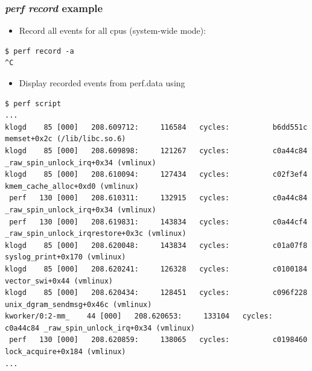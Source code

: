 \begin{frame}[fragile]
  \frametitle{{\em perf record} example}

  \begin{itemize}
    \item Record all events for all cpus (system-wide mode):
  \end{itemize}
  \begin{block}{}
    \begin{verbatim}
$ perf record -a
^C
    \end{verbatim}
  \end{block}
  \begin{itemize}
    \item Display recorded events from perf.data using 
  \end{itemize}
  \begin{block}{}
    \begin{verbatim}
$ perf script
...
klogd    85 [000]   208.609712:     116584   cycles:          b6dd551c memset+0x2c (/lib/libc.so.6)
klogd    85 [000]   208.609898:     121267   cycles:          c0a44c84 _raw_spin_unlock_irq+0x34 (vmlinux)
klogd    85 [000]   208.610094:     127434   cycles:          c02f3ef4 kmem_cache_alloc+0xd0 (vmlinux)
 perf   130 [000]   208.610311:     132915   cycles:          c0a44c84 _raw_spin_unlock_irq+0x34 (vmlinux)
 perf   130 [000]   208.619831:     143834   cycles:          c0a44cf4 _raw_spin_unlock_irqrestore+0x3c (vmlinux)
klogd    85 [000]   208.620048:     143834   cycles:          c01a07f8 syslog_print+0x170 (vmlinux)
klogd    85 [000]   208.620241:     126328   cycles:          c0100184 vector_swi+0x44 (vmlinux)
klogd    85 [000]   208.620434:     128451   cycles:          c096f228 unix_dgram_sendmsg+0x46c (vmlinux)
kworker/0:2-mm_    44 [000]   208.620653:     133104   cycles:          c0a44c84 _raw_spin_unlock_irq+0x34 (vmlinux)
 perf   130 [000]   208.620859:     138065   cycles:          c0198460 lock_acquire+0x184 (vmlinux)
...
    \end{verbatim}
  \end{block}
\end{frame}


